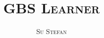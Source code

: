 \documentclass[a4paper]{article}
\begin{document}
	\title{\textsc{GBS Learner}}
	\date{}
	\author{\textsc{Su Stefan}}
	\maketitle
	\tableofcontents
	
	
\end{document}
